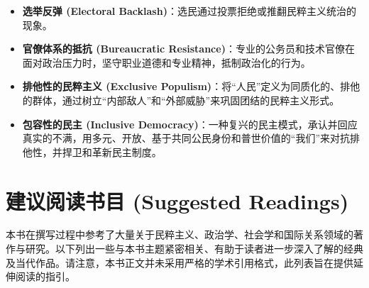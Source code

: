 \begin{itemize}
    \item \textbf{选举反弹 (Electoral Backlash)}：选民通过投票拒绝或推翻民粹主义统治的现象。

    \item \textbf{官僚体系的抵抗 (Bureaucratic Resistance)}：专业的公务员和技术官僚在面对政治压力时，坚守职业道德和专业精神，抵制政治化的行为。

    \item \textbf{排他性的民粹主义 (Exclusive Populism)}：将“人民”定义为同质化的、排他的群体，通过树立“内部敌人”和“外部威胁”来巩固团结的民粹主义形式。

    \item \textbf{包容性的民主 (Inclusive Democracy)}：一种复兴的民主模式，承认并回应真实的不满，用多元、开放、基于共同公民身份和普世价值的“我们”来对抗排他性，并捍卫和革新民主制度。
\end{itemize}

\section{建议阅读书目 (Suggested Readings)}

本书在撰写过程中参考了大量关于民粹主义、政治学、社会学和国际关系领域的著作与研究。以下列出一些与本书主题紧密相关、有助于读者进一步深入了解的经典及当代作品。请注意，本书正文并未采用严格的学术引用格式，此列表旨在提供延伸阅读的指引。

